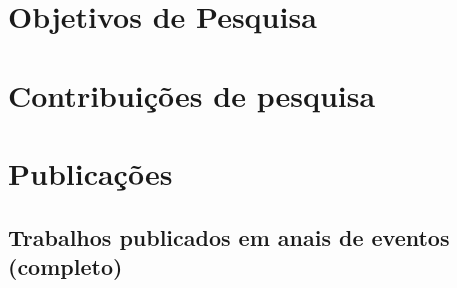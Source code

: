 \section{Objetivos de Pesquisa}


\section{Contribuições de pesquisa}


\section{Publicações}

\subsection{Trabalhos publicados em anais de eventos (completo)}


